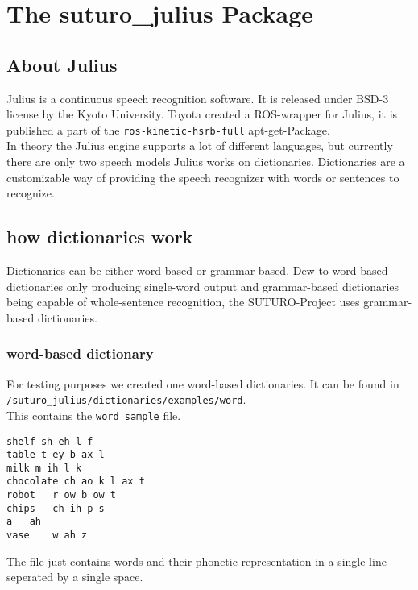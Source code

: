 \documentclass[main.tex]{subfiles}
\begin{document}
\newpage
\section{The suturo\_julius Package}

    \subsection{About Julius}
      Julius is a continuous speech recognition software. It is released under BSD-3 license by the Kyoto University. Toyota created a ROS-wrapper for Julius, it is published a part of the \texttt{ros-kinetic-hsrb-full} apt-get-Package.\\
      In theory the Julius engine supports a lot of different languages, but currently there are only two speech models
     Julius works on dictionaries. Dictionaries are a customizable way of providing the speech recognizer with words or sentences to recognize.
    \subsection{how dictionaries work}
      Dictionaries can be either word-based or grammar-based. Dew to word-based dictionaries only producing single-word output and grammar-based dictionaries being capable of whole-sentence recognition, the SUTURO-Project uses grammar-based dictionaries.
    
        \subsubsection{word-based dictionary}
            For testing purposes we created one word-based dictionaries. It can be found in \lstinline|/suturo_julius/dictionaries/examples/word|.\\
            This contains the \texttt{word\_sample} file.\\
            \begin{lstlisting}
shelf sh eh l f
table t ey b ax l
milk m ih l k
chocolate ch ao k l ax t
robot	r ow b ow t
chips	ch ih p s
a	ah
vase	w ah z
            \end{lstlisting}
            The file just contains words and their phonetic representation in a single line seperated by a single space.
            
\end{document}
